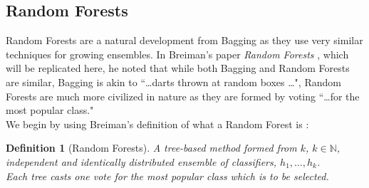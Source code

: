 \documentclass[11pt,a4paper]{report}
\newtheorem{definition}{Definition}
\begin{document}
\subsection{Random Forests}
Random Forests are a natural development from Bagging as they use very similar techniques for growing ensembles. 
In Breiman's paper \textit{Random Forests} \cite{randomforest}, which will be replicated here, he noted that while both Bagging and Random Forests are similar, Bagging is akin to ``\dots darts thrown at random boxes \dots", Random Forests are much more civilized in nature as they are formed by voting ``\dots for the most popular class."
\medskip\\
We begin by using Breiman's definition of what a Random Forest is \cite{randomforest}:
\begin{definition}[Random Forests]
    A tree-based method formed from $k$, $k \in \mathbb{N}$, independent and identically distributed ensemble of classifiers, $h_1, \dots , h_k$.\\
    Each tree casts one vote for the most popular class which is to be selected.
\end{definition}
\end{document}
